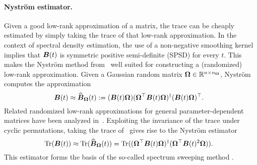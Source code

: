 \paragraph{Nyström estimator.} Given a good low-rank approximation of a matrix, the trace can be cheaply estimated by simply taking the trace of that low-rank approximation. In the context of spectral density estimation, the use of a non-negative smoothing kernel implies that $\boldsymbol{B}(t)$ is symmetric positive semi-definite (SPSD) for every $t$. This makes the Nyström method
from~\cite{gittens-2013-revisiting-nystrom} well suited for constructing a (randomized) low-rank approximation.
Given a Gaussian random matrix $\boldsymbol{\Omega} \in \mathbb{R}^{n \times n_{\boldsymbol{\Omega}}}$, Nyström computes the approximation
\begin{equation}
    \boldsymbol{B}(t) \approx \widehat{\boldsymbol{B}}_{\boldsymbol{\Omega}}(t) := (\boldsymbol{B}(t) \boldsymbol{\Omega}) (\boldsymbol{\Omega}^{\top} \boldsymbol{B}(t) \boldsymbol{\Omega})^{\dagger} (\boldsymbol{B}(t) \boldsymbol{\Omega})^{\top}.
    \label{equ:nystrom-approximation}
\end{equation}
Related randomized low-rank approximations for general parameter-dependent matrices have been analyzed in~\cite{kressner-2024-randomized-lowrank}.
Exploiting the invariance of the trace under cyclic permutations, taking the trace of~ gives rise to the Nyström estimator
\begin{equation}
    \operatorname{Tr}(\boldsymbol{B}(t)) \approx \operatorname{Tr}(\widehat{\boldsymbol{B}}_{\boldsymbol{\Omega}}(t)) = \operatorname{Tr}( (\boldsymbol{\Omega}^{\top} \boldsymbol{B}(t) \boldsymbol{\Omega})^{\dagger} ( \boldsymbol{\Omega}^{\top} \boldsymbol{B}(t)^2 \boldsymbol{\Omega})).
    \label{equ:nystrom-trace-estimator}
\end{equation}
This estimator forms the basis of the so-called spectrum sweeping method \cite{lin-2017-randomized-estimation}. 


%
%

